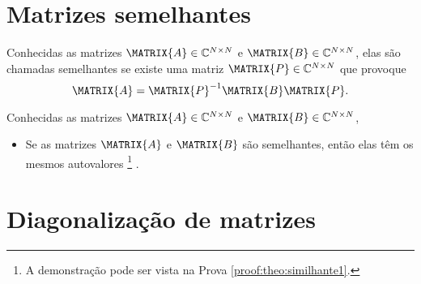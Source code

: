 \section{Matrizes semelhantes}


\begin{definition}\label{def:similhante0}
Conhecidas as matrizes  $\MATRIX{A} \in \mathbb{C}^{N \times N}$ e $\MATRIX{B} \in \mathbb{C}^{N \times N}$,
elas são chamadas semelhantes \cite[pp. 67]{golub2013matrix} 
se existe uma matriz $\MATRIX{P} \in \mathbb{C}^{N \times N}$ que provoque
\begin{equation}
\MATRIX{A} = \MATRIX{P}^{-1} \MATRIX{B} \MATRIX{P}.
\end{equation}
\end{definition}

\begin{theorem}\label{theo:similhante1}
Conhecidas as matrizes $\MATRIX{A} \in \mathbb{C}^{N \times N}$ e $\MATRIX{B} \in \mathbb{C}^{N \times N}$,
\begin{itemize}
\item Se as matrizes $\MATRIX{A}$ e $\MATRIX{B}$ são semelhantes, então elas têm os mesmos autovalores
\footnote{A demonstração pode ser vista na Prova \ref{proof:theo:similhante1}.} \cite[pp. 67]{golub2013matrix}.
\end{itemize}
\end{theorem}

\section{Diagonalização de matrizes}

